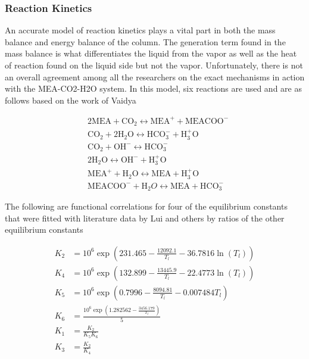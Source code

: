 \subsubsection{Reaction Kinetics}

An accurate model of reaction kinetics plays a vital part in both the mass balance and energy balance of the column. The generation term found in the mass balance is what differentiates the liquid from the vapor as well as the heat of reaction found on the liquid side but not the vapor. Unfortunately, there is not an overall agreement among all the researchers on the exact mechanisms in action with the MEA-CO2-H2O system. In this model, six reactions are used and are as follows based on the work of Vaidya \cite{Vaidya2007}

$$
\begin{aligned}
& 2\mathrm{MEA} +\mathrm{CO}_2 \leftrightarrow \mathrm{MEA}^{+}+\mathrm{MEACOO}^{-}  \\
& \mathrm{CO}_2 + 2\mathrm{H}_2 \mathrm{O} \leftrightarrow  \mathrm{HCO}^{-}_{3} +\mathrm{H}_{3}^{+}\mathrm{O}\\
& \mathrm{CO}_2 + \mathrm{OH}^- \leftrightarrow  \mathrm{HCO}^{-}_{3}\\
& 2\mathrm{H}_2 \mathrm{O} \leftrightarrow  \mathrm{OH}^{-} +\mathrm{H}_{3}^{+}\mathrm{O}\\
& \mathrm{MEA}^{+} + \mathrm{H}_2 \mathrm{O} \leftrightarrow  \mathrm{MEA} +\mathrm{H}_{3}^{+}\mathrm{O}\\
& \mathrm{MEACOO}^{-} + \mathrm{H}_2 O \leftrightarrow \mathrm{MEA} +\mathrm{HCO}_3^{-}
\end{aligned}
$$

The following are functional correlations for four of the equilibrium constants that were fitted with literature data by Lui and others by ratios of the other equilibrium constants \cite{Liu1999}

\begin{align}
K_2&={10}^6 \exp \left({231.465-\frac{12092.1}{T_l}-36.7816\ln\left(T_l\right)} \right) \\
K_4&={10}^6 \exp \left({132.899-\frac{13445.9}{T_l}-22.4773\ln\left(T_l\right)} \right) \\
K_5&={10}^6 \exp \left({0.7996-\frac{8094.81}{T_l}-0.007484T_l}  \right)\\
K_6&=\frac{{10}^6 \exp \left({1.282562-\frac{3456.179}{T_l}}\right)}{5} \\
K_1&=\frac{K_2}{K_5 K_6} \\
K_3&=\frac{K_2}{K_4}
\end{align}

